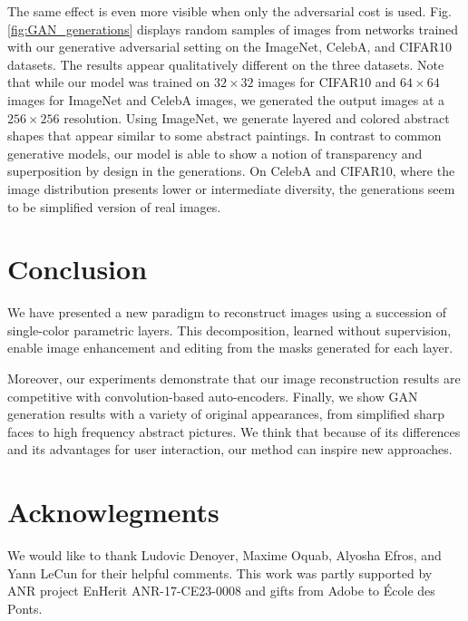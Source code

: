 \documentclass[10pt,twocolumn,letterpaper]{article}
\begin{document}
The same effect is even more visible when only the adversarial cost is used. Fig. \ref{fig:GAN_generations} displays random samples of images from networks trained with our generative adversarial setting on the ImageNet, CelebA, and CIFAR10 datasets. The results appear qualitatively different on the three datasets. Note that while our model was trained on $32\times32$ images for CIFAR10 and $64\times 64$ images for ImageNet and CelebA images, we generated the output images at a $256\times256$ resolution. Using ImageNet, we generate layered and colored abstract shapes that appear similar to some abstract paintings. In contrast to common generative models, our model is able to show a notion of transparency and superposition by design in the generations. On CelebA and CIFAR10, where the image distribution presents lower or intermediate diversity, the generations seem to be simplified version of real images. 



\section{Conclusion}

We have presented a new paradigm to reconstruct images using a succession of single-color parametric layers. This decomposition, learned without supervision, enable image enhancement and editing from the masks generated for each layer.

Moreover, our experiments demonstrate that our image reconstruction results are competitive with convolution-based auto-encoders.
Finally, we show GAN generation results with a variety of original appearances, from simplified sharp faces to high frequency abstract pictures.
We think that because of its differences and its advantages for user interaction, our method can inspire new approaches.

\section*{Acknowlegments}

We would like to thank Ludovic Denoyer, Maxime Oquab, Alyosha Efros, and Yann LeCun for their helpful comments. This work was partly supported by ANR project EnHerit ANR-17-CE23-0008 and gifts from Adobe to \'Ecole des Ponts.


{\small


}
\end{document}
